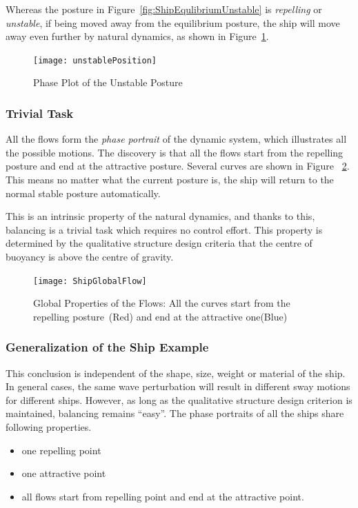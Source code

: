 Whereas the  posture in Figure~\ref{fig:ShipEqulibriumUnstable} is \emph{repelling} or \emph{unstable}, if being moved away from the equilibrium posture,  the ship will move away even further by natural dynamics, as shown in Figure~\ref{fig:unStablePosture}.

\begin{figure}[!htbp]
  \begin{center}
      \texttt{[image: unstablePosition]}
    \caption{Phase Plot of the Unstable Posture}
    \label{fig:unStablePosture}
  \end{center}
\end{figure}


\subsubsection*{Trivial Task}
All the flows form the \emph{phase portrait} of the dynamic system, which illustrates all the possible motions. 
The discovery is that all the flows start from the repelling posture and end at the attractive posture.
Several curves are shown in Figure ~\ref{fig:globalflow}.
This means no matter what the current posture is, the ship will return to the normal stable posture automatically.

This is an intrinsic property of the natural dynamics, and thanks to this, balancing is a trivial task which requires no control effort. 
This property is determined by the qualitative structure design criteria that the centre of buoyancy  is above the centre of gravity.

\begin{figure}[!htbp]
  \begin{center}
   \texttt{[image: ShipGlobalFlow]}
   \caption{Global Properties of the Flows: All the curves start from the repelling posture~(Red) and end at the attractive one(Blue)}
   \label{fig:globalflow}
  \end{center}
\end{figure}

 



\subsubsection*{Generalization of the Ship Example} 
This conclusion is independent of the shape, size, weight or material of the ship. 
In general cases, the same wave perturbation will result in different sway motions for different ships.
However, as long as the qualitative structure design criterion is maintained, balancing remains ``easy''.
The phase portraits of all the ships share following properties. 
\begin{itemize}
\item one repelling point 
\item one attractive point 
\item all flows start from repelling point and end at the  attractive point. 
\end{itemize}

